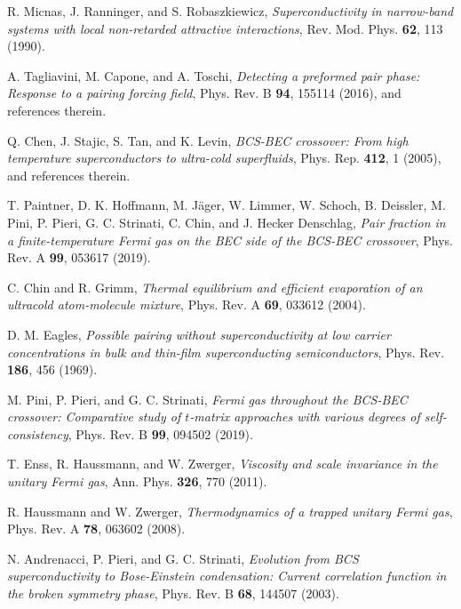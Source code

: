 \documentclass[pra,twocolumn,aps,amssymb,showpacs,superscriptaddress]{revtex4-1}
\begin{document}
\begin{thebibliography}{99}

 R. Micnas, J. Ranninger, and S. Robaszkiewicz, \emph{Superconductivity in narrow-band systems with local non-retarded attractive interactions}, Rev. Mod. Phys. {\bf 62}, 113 (1990).

 A. Tagliavini, M. Capone, and A. Toschi, \emph{Detecting a preformed pair phase: Response to a pairing forcing field}, Phys. Rev. B {\bf 94}, 155114 (2016), and references therein.

 Q. Chen, J. Stajic, S. Tan, and K. Levin, \emph{BCS-BEC crossover: From high temperature superconductors to ultra-cold superfluids}, Phys. Rep. {\bf 412}, 1 (2005), and references therein.

 T. Paintner, D. K. Hoffmann, M. J\"{a}ger, W. Limmer, W. Schoch, B. Deissler, M. Pini, P. Pieri, G. C. Strinati, C. Chin, and J. Hecker Denschlag, 
                                         \emph{Pair fraction in a finite-temperature Fermi gas on the BEC side of the BCS-BEC crossover}, Phys. Rev. A {\bf 99}, 053617 (2019).

 C. Chin and R. Grimm, \emph{Thermal equilibrium and efficient evaporation of an ultracold atom-molecule mixture}, 
                                             Phys. Rev. A {\bf 69}, 033612 (2004).

 D. M. Eagles, \emph{Possible pairing without superconductivity at low carrier concentrations in bulk and thin-film superconducting semiconductors}, 
                                    Phys. Rev. {\bf 186}, 456 (1969).

 M. Pini, P. Pieri, and G. C. Strinati, \emph{Fermi gas throughout the BCS-BEC crossover: Comparative study of $t$-matrix approaches with various degrees of self-consistency},
                                 Phys. Rev. B {\bf 99}, 094502 (2019).
 
 T. Enss, R. Haussmann, and W. Zwerger, \emph{Viscosity and scale invariance in the unitary Fermi gas},  Ann. Phys. {\bf 326}, 770 (2011).

 R. Haussmann and W. Zwerger, \emph{Thermodynamics of a trapped unitary Fermi gas}, Phys. Rev. A {\bf 78}, 063602 (2008).
                                  
 N. Andrenacci, P. Pieri, and G. C. Strinati, \emph{Evolution from BCS superconductivity to Bose-Einstein condensation:
                                           Current correlation function in the broken symmetry phase}, Phys. Rev. B {\bf 68}, 144507 (2003).


\end{thebibliography}
\end{document}
